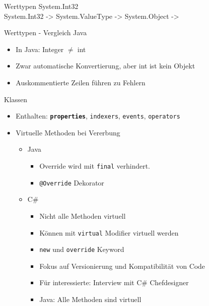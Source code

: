 \documentclass[11pt]{beamer}
\begin{document}
\begin{frame}{Werttypen}
System.Int32 \\ %
System.Int32 -> System.ValueType -> System.Object ->
\end{frame}


\begin{frame}{Werttypen - Vergleich Java}
	\begin{itemize}
		\item In Java: Integer $\neq$ int
		\item Zwar automatische Konvertierung, aber int ist kein Objekt
		\item Auskommentierte Zeilen führen zu Fehlern
	\end{itemize}
	
\end{frame}

\begin{frame}{Klassen}

	\begin{itemize}
		\item  Enthalten: \textbf{\texttt{properties}}, \texttt{indexers}, \texttt{events}, \texttt{operators}
		\item Virtuelle Methoden bei Vererbung 
		\begin{itemize}
			\item Java
			\begin{itemize}
				\item Override wird mit \texttt{final} verhindert.
				\item \texttt{@Override} Dekorator
			\end{itemize}
			\item C\#
			\begin{itemize}
				\item Nicht alle Methoden virtuell
				\item Können mit \texttt{virtual} Modifier virtuell werden
				\item \texttt{new} und \texttt{override} Keyword 
				\item Fokus auf Versionierung und Kompatibilität von Code
				\item Für interessierte: Interview mit C\# Chefdesigner \cite{interview_virtual}
				\item Java: Alle Methoden sind virtuell
			\end{itemize}
			
		\end{itemize}
	\end{itemize}
\end{frame}
\end{document}
